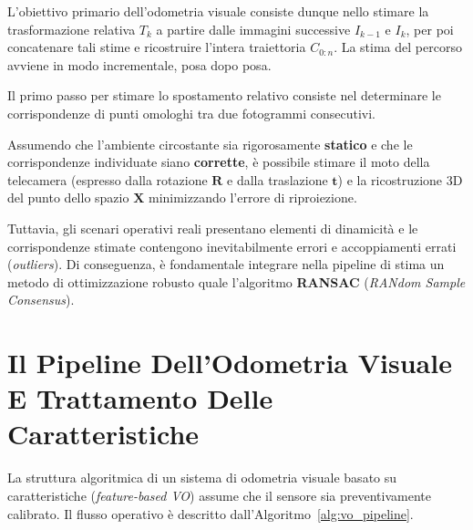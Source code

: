 ﻿\documentclass[11pt, a4paper]{article}
\begin{document}
L'obiettivo primario dell'odometria visuale consiste dunque nello stimare la trasformazione relativa $T_k$ a partire dalle immagini successive $I_{k-1}$ e $I_k$, per poi concatenare tali stime e ricostruire l'intera traiettoria $C_{0:n}$. La stima del percorso avviene in modo incrementale, posa dopo posa.


Il primo passo per stimare lo spostamento relativo consiste nel determinare le corrispondenze di punti omologhi tra due fotogrammi consecutivi.


Assumendo che l'ambiente circostante sia rigorosamente \textbf{statico} e che le corrispondenze individuate siano \textbf{corrette}, è possibile stimare il moto della telecamera (espresso dalla rotazione $\bm{R}$ e dalla traslazione $\bm{t}$) e la ricostruzione 3D del punto dello spazio $\bm{X}$ minimizzando l'errore di riproiezione.


Tuttavia, gli scenari operativi reali presentano elementi di dinamicità e le corrispondenze stimate contengono inevitabilmente errori e accoppiamenti errati (\emph{outliers}). Di conseguenza, è fondamentale integrare nella pipeline di stima un metodo di ottimizzazione robusto quale l'algoritmo \textbf{RANSAC} (\emph{RANdom Sample Consensus}).

\newpage

\section{Il Pipeline Dell'Odometria Visuale E Trattamento Delle Caratteristiche}

La struttura algoritmica di un sistema di odometria visuale basato su caratteristiche (\emph{feature-based VO}) assume che il sensore sia preventivamente calibrato. Il flusso operativo è descritto dall'Algoritmo~\ref{alg:vo_pipeline}.
\end{document}
